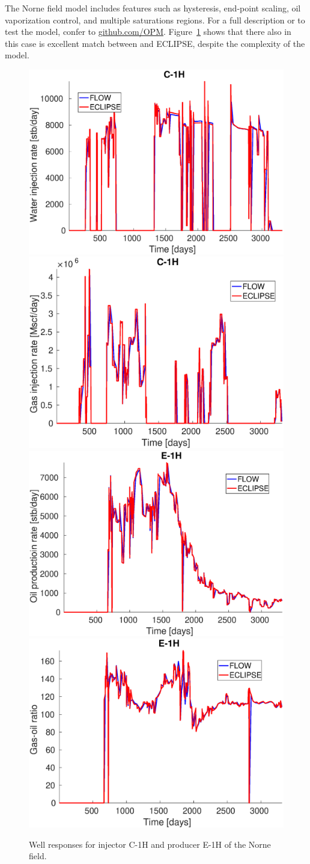 The Norne field model includes features such as hysteresis, end-point scaling,
oil vaporization control, and multiple saturations regions.  For a full 
description or to test the model, confer to \href{http://github.com/OPM}{github.com/OPM}. 
Figure~\ref{fig:norne-match} shows that there also in this case is excellent match between
\opmflow and ECLIPSE, despite the complexity of the model.
\begin{figure}
  \includegraphics[width=.49\textwidth]{figures/norne/WWIR_C-1H}\hfill
  \includegraphics[width=.49\textwidth]{figures/norne/WGIR_C-1H}\\
  \includegraphics[width=.49\textwidth]{figures/norne/WOPR_E-1H}\hfill
  \includegraphics[width=.49\textwidth]{figures/norne/WGOR_E-1H}
  \caption{Well responses for injector C-1H and producer E-1H of the Norne field.}
  \label{fig:norne-match}
\end{figure}


